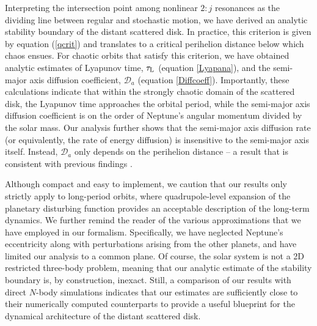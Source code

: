\documentclass[twocolumn]{aastex62}
\begin{document}
Interpreting the intersection point among nonlinear $2:j$ resonances as the dividing line between regular and stochastic motion, we have derived an analytic stability boundary of the distant scattered disk. In practice, this criterion is given by equation (\ref{qcrit}) and translates to a critical perihelion distance below which chaos ensues. For chaotic orbits that satisfy this criterion, we have obtained analytic estimates of Lyapunov time, $\tau_{\rm{L}}$ (equation \ref{Lyapana}), and the semi-major axis diffusion coefficient, $\mathcal{D}_a$ (equation \ref{Diffcoeff}). Importantly, these calculations indicate that within the strongly chaotic domain of the scattered disk, the Lyapunov time approaches the orbital period, while the semi-major axis diffusion coefficient is on the order of Neptune's angular momentum divided by the solar mass. Our analysis further shows that the semi-major axis diffusion rate (or equivalently, the rate of energy diffusion) is insensitive to the semi-major axis itself. Instead, $\mathcal{D}_a$ only depends on the perihelion distance -- a result that is consistent with previous findings \citep{2004AJ....128.1418P, 2013Icar..222...20F}.

Although compact and easy to implement, we caution that our results only strictly apply to long-period orbits, where quadrupole-level expansion of the planetary disturbing function provides an acceptable description of the long-term dynamics. We further remind the reader of the various approximations that we have employed in our formalism. Specifically, we have neglected Neptune's eccentricity along with perturbations arising from the other planets, and have limited our analysis to a common plane. Of course, the solar system is not a 2D restricted three-body problem, meaning that our analytic estimate of the stability boundary is, by construction, inexact. Still, a comparison of our results with direct $N$-body simulations indicates that our estimates are sufficiently close to their numerically computed counterparts to provide a useful blueprint for the dynamical architecture of the distant scattered disk.
\end{document}
